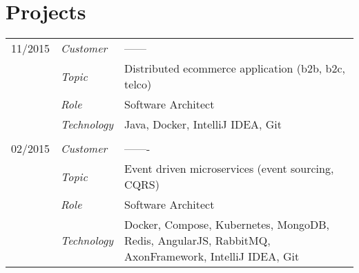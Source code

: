 \section*{Projects}
\renewcommand{\arraystretch}{1.3}
\begin{longtable}{@{}>{}p{4cm}>{\itshape}p{2cm}>{}p{9cm}}
11/2015             & Customer 	    & ------\\
\nopagebreak		& Topic 	    & Distributed ecommerce application (b2b, b2c, telco)\\
\nopagebreak		& Role   	    & Software Architect\\
\nopagebreak		& Technology	& Java, Docker, IntelliJ IDEA, Git\\
\\
02/2015             & Customer 	    & -------\\
\nopagebreak		& Topic	        & Event driven microservices (event sourcing, CQRS)\\
\nopagebreak		& Role 	        & Software Architect\\
\nopagebreak		& Technology	& Docker, Compose, Kubernetes, MongoDB, Redis, AngularJS, RabbitMQ, AxonFramework, IntelliJ IDEA, Git\\

\end{longtable}
\renewcommand{\arraystretch}{2}


